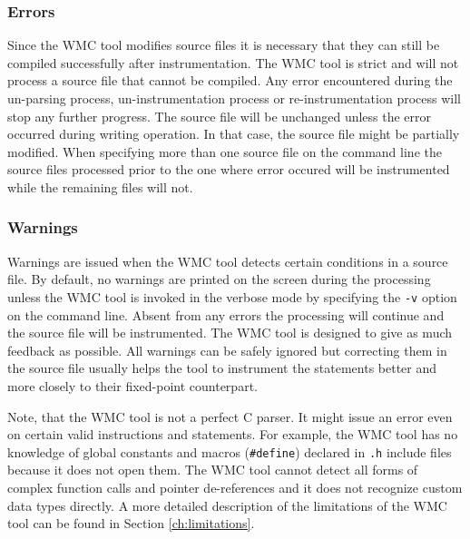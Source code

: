 \subsubsection{Errors}

Since the WMC tool modifies source files it is necessary that they can still be compiled successfully after instrumentation. The WMC tool is strict and will not process a source file that cannot be compiled. Any error encountered during the un-parsing process, un-instrumentation process or re-instrumentation process will stop any further progress. The source file will be unchanged unless the error occurred during writing operation. In that case, the source file might be partially modified. When specifying more than one source file on the command line the source files processed prior to the one where error occured will be instrumented while the remaining files will not.

\subsubsection{Warnings}

Warnings are issued when the WMC tool detects certain conditions in a source file. By default, no warnings are printed on the screen during the processing unless the WMC tool is invoked in the verbose mode by specifying the \verb|-v| option on the command line. Absent from any errors the processing will continue and the source file will be instrumented. The WMC tool is designed to give as much feedback as possible. All warnings can be safely ignored but correcting them in the source file usually helps the tool to instrument the statements better and more closely to their fixed-point counterpart.

Note, that the WMC tool is not a perfect C parser. It might issue an error even on certain valid instructions and statements. For example, the WMC tool has no knowledge of global constants and macros (\verb|#define|) declared in \verb|.h| include files because it does not open them. The WMC tool cannot detect all forms of complex function calls and pointer de-references and it does not recognize custom data types directly. A more detailed description of the limitations of the WMC tool can be found in Section \ref{ch:limitations}.

